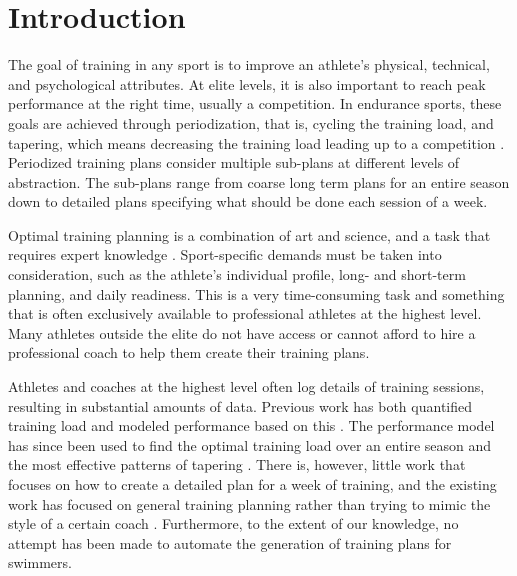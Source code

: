 \chapter{Introduction}

The goal of training in any sport is to improve an athlete's physical, technical, and psychological attributes.
At elite levels, it is also important to reach peak performance at the right time, usually a competition.
In endurance sports, these goals are achieved through periodization, that is, cycling the training load, and tapering, which means decreasing the training load leading up to a competition \cite{bompa1983theory, mujika1995effects}.
Periodized training plans consider multiple sub-plans at different levels of abstraction.
The sub-plans range from coarse long term plans for an entire season down to detailed plans specifying what should be done each session of a week.

Optimal training planning is a combination of art and science, and a task that requires expert knowledge \cite{issurin2010new,smith2003framework}.
Sport-specific demands must be taken into consideration, such as the athlete’s individual profile, long- and short-term planning, and daily readiness.
This is a very time-consuming task and something that is often exclusively available to professional athletes at the highest level.
Many athletes outside the elite do not have access or cannot afford to hire a professional coach to help them create their training plans.

Athletes and coaches at the highest level often log details of training sessions, resulting in substantial amounts of data.
Previous work has both quantified training load and modeled performance based on this \cite{banister1991modeling, busso1997modeling, mujika1996modeled}.
The performance model has since been used to find the optimal training load over an entire season and the most effective patterns of tapering \cite{busso2006using, thomas2008model, thomas2009computer}.
There is, however, little work that focuses on how to create a detailed plan for a week of training, and the existing work has focused on general training planning rather than trying to mimic the style of a certain coach \cite{fister2019generating,skerik2018automated}.
Furthermore, to the extent of our knowledge, no attempt has been made to automate the generation of training plans for swimmers.

